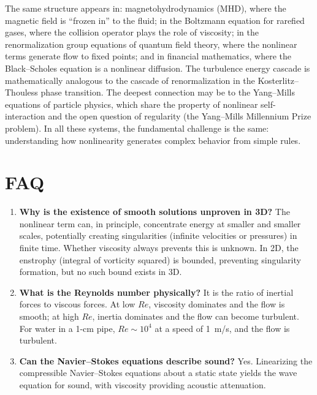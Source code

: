 \documentclass[11pt,openright]{book}
\begin{document}
The same structure appears in: magnetohydrodynamics (MHD), where the magnetic field is ``frozen in'' to the fluid; in the Boltzmann equation for rarefied gases, where the collision operator plays the role of viscosity; in the renormalization group equations of quantum field theory, where the nonlinear terms generate flow to fixed points; and in financial mathematics, where the Black--Scholes equation is a nonlinear diffusion. The turbulence energy cascade is mathematically analogous to the cascade of renormalization in the Kosterlitz--Thouless phase transition. The deepest connection may be to the Yang--Mills equations of particle physics, which share the property of nonlinear self-interaction and the open question of regularity (the Yang--Mills Millennium Prize problem). In all these systems, the fundamental challenge is the same: understanding how nonlinearity generates complex behavior from simple rules.

\section*{FAQ}

\begin{enumerate}
\item \textbf{Why is the existence of smooth solutions unproven in 3D?}
The nonlinear term can, in principle, concentrate energy at smaller and smaller scales, potentially creating singularities (infinite velocities or pressures) in finite time. Whether viscosity always prevents this is unknown. In 2D, the enstrophy (integral of vorticity squared) is bounded, preventing singularity formation, but no such bound exists in 3D.

\item \textbf{What is the Reynolds number physically?}
It is the ratio of inertial forces to viscous forces. At low $Re$, viscosity dominates and the flow is smooth; at high $Re$, inertia dominates and the flow can become turbulent. For water in a 1-cm pipe, $Re \sim 10^{4}$ at a speed of 1~m/s, and the flow is turbulent.

\item \textbf{Can the Navier--Stokes equations describe sound?}
Yes. Linearizing the compressible Navier--Stokes equations about a static state yields the wave equation for sound, with viscosity providing acoustic attenuation.
\end{enumerate}
\end{document}
